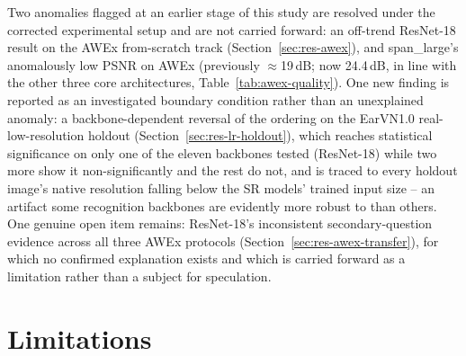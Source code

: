 \documentclass[11pt]{article}
\begin{document}
Two anomalies flagged at an earlier stage of this study are resolved under the corrected experimental setup and are not carried forward: an off-trend ResNet-18 result on the AWEx from-scratch track (Section~\ref{sec:res-awex}), and span\_large's anomalously low PSNR on AWEx (previously $\approx$19\,dB; now 24.4\,dB, in line with the other three core architectures, Table~\ref{tab:awex-quality}). One new finding is reported as an investigated boundary condition rather than an unexplained anomaly: a backbone-dependent reversal of the ordering on the EarVN1.0 real-low-resolution holdout (Section~\ref{sec:res-lr-holdout}), which reaches statistical significance on only one of the eleven backbones tested (ResNet-18) while two more show it non-significantly and the rest do not, and is traced to every holdout image's native resolution falling below the SR models' trained input size -- an artifact some recognition backbones are evidently more robust to than others. One genuine open item remains: ResNet-18's inconsistent secondary-question evidence across all three AWEx protocols (Section~\ref{sec:res-awex-transfer}), for which no confirmed explanation exists and which is carried forward as a limitation rather than a subject for speculation.

\section{Limitations}
\label{sec:limitations}
\end{document}
